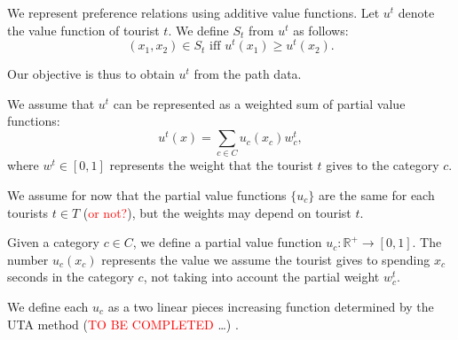 \documentclass[a4paper]{article}
\begin{document}
We represent preference relations using additive value functions. Let $u^t$ denote the value function of tourist $t$. We define $S_t$ from  $u^t$ as follows:
\begin{equation}
(x_1,x_2) \in S_t \text { iff } u^t(x_1) \geq u^t(x_2).
\end{equation}

Our objective is thus to obtain $u^t$ from the path data.

We assume that $u^t$ can be represented as a weighted sum  of partial value functions:
\begin{equation}
u^t(x) = \sum_{c \in C} u_c(x_c) w^t_c,
\end{equation}
where $w^t \in [0,1]$ represents the weight that the tourist $t$ gives to the category $c$.

We assume for now that the partial value functions $\{u_c\}$ are the same for each tourists $t \in T$ (\textcolor{red}{or not?}), but the weights may depend on tourist $t$.

Given a category $c \in C$, we define a partial value function $u_c:{\mathbb{R}^+} \rightarrow [0,1]$. The number $u_c(x_c)$ represents the value we assume the tourist gives to spending $x_c$ seconds in the category $c$, not taking into account the partial weight $w^t_c$.

We define each $u_c$ as a two linear pieces increasing function determined by the UTA method (\textcolor{red}{TO BE COMPLETED} \dots) .
\end{document}
